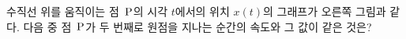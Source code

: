 \noindent\begin{minipage}[t]{0.58\linewidth}\vspace{0pt}\raggedright 수직선 위를 움직이는 점~$\mathrm{P}$의 시각 $t$에서의 위치 $x(t)$의 그래프가 오른쪽 그림과 같다. 다음 중 점~$\mathrm{P}$가 두 번째로 원점을 지나는 순간의 속도와 그 값이 같은 것은?\end{minipage}\hfill\begin{minipage}[t]{0.4\linewidth}\vspace{0pt}\centering \resizebox{\ifdim\width>\linewidth\linewidth\else\width\fi}{!}{}\end{minipage}\par
{}
